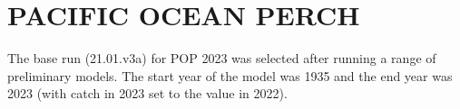 \documentclass[11pt]{book}
\begin{document}
\section{PACIFIC OCEAN PERCH} \label{s:POP}




\renewcommand{\startYear}{1935} %
\renewcommand{\currYear}{2024}   %
\renewcommand{\prevYear}{2023}   %
\renewcommand{\projYear}{2034}   %
\renewcommand{\pgenYear}{75}   %

The base run (21.01.v3a) for POP 2023 was selected after running a range of preliminary models.
The start year of the model was 1935 and the end year was 2023 (with catch in 2023 set to the value in 2022).
\end{document}
